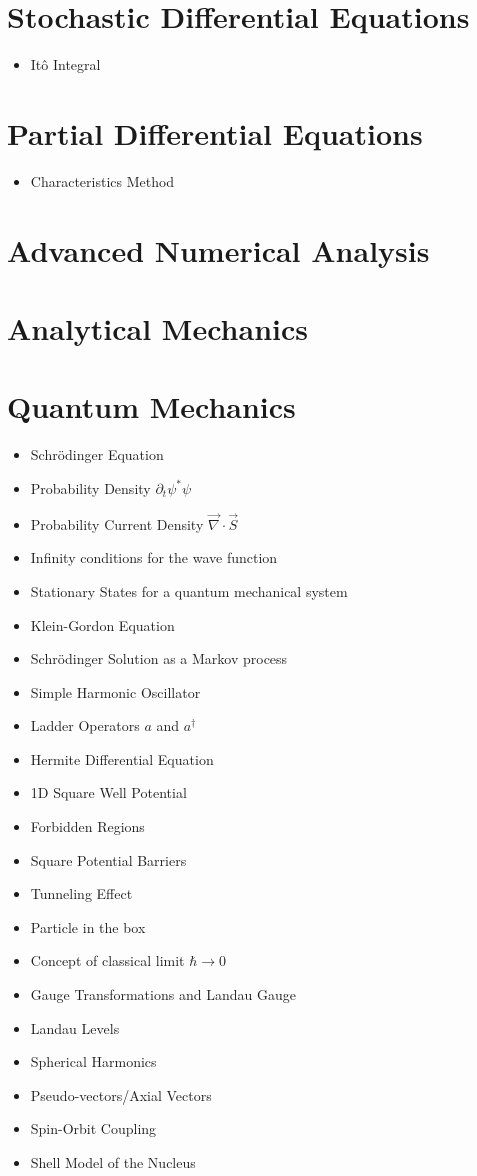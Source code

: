 \documentclass[10pt]{article}
\begin{document}
\section{Stochastic Differential Equations}
\begin{itemize}
	\item It\^o Integral
	\end{itemize}
\section{Partial Differential Equations}
\begin{itemize}
	\item Characteristics Method
\end{itemize}
\section{Advanced Numerical Analysis}
\section{Analytical Mechanics}
\section{Quantum Mechanics}
\begin{itemize}
	\item Schr\"odinger Equation
	\item Probability Density $\partial_t \psi^*\psi$
	\item Probability Current Density $\vec{\nabla}\cdot\vec{S}$
	\item Infinity conditions for the wave function
	\item Stationary States for a quantum mechanical system
	\item Klein-Gordon Equation
	\item Schr\"odinger Solution as a Markov process
	\item Simple Harmonic Oscillator
	\item Ladder Operators $a$ and $a^{\dag}$
	\item Hermite Differential Equation
	\item 1D Square Well Potential
	\item Forbidden Regions
	\item Square Potential Barriers
	\item Tunneling Effect
	\item Particle in the box
	\item Concept of classical limit $\hbar \to 0$
	\item Gauge Transformations and Landau Gauge
	\item Landau Levels
	\item Spherical Harmonics
	\item Pseudo-vectors/Axial Vectors
	\item Spin-Orbit Coupling
	\item Shell Model of the Nucleus
	\end{itemize}
\end{document}
